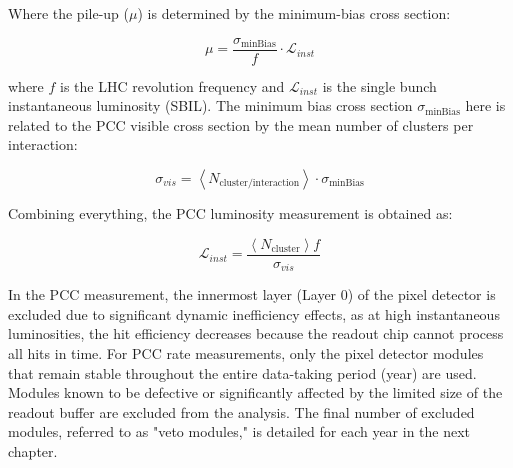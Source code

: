 Where the pile-up ($\mu$) is determined by the minimum-bias cross section: 

\begin{equation}
\mu = \frac{\sigma_{\text{minBias}}}{f} \cdot \mathcal{L}_{inst}
\end{equation}

where $f$ is the LHC revolution frequency and $\mathcal{L}_{inst}$ is the single bunch instantaneous luminosity (SBIL). The minimum bias cross section $\sigma_{\text{minBias}}$ here is related to the PCC visible cross section by the mean number of clusters per interaction:

\begin{equation}
\sigma_{vis}= \left < N_{\text{cluster}/\text{interaction}} \right >\cdot \sigma_{\text{minBias}}
\end{equation}

Combining everything, the PCC luminosity measurement is obtained as:

\begin{equation}
\mathcal{L}_{inst}=\frac{\left < N_{\text{cluster}} \right> f}{\sigma_{vis}}
\end{equation}

In the PCC measurement, the innermost layer (Layer 0) of the pixel detector is excluded due to significant dynamic inefficiency effects, as at high instantaneous luminosities, the hit efficiency decreases because the readout chip cannot process all hits in time. For PCC rate measurements, only the pixel detector modules that remain stable throughout the entire data-taking period (year) are used. Modules known to be defective or significantly affected by the limited size of the readout buffer are excluded from the analysis. The final number of excluded modules, referred to as "veto modules," is detailed for each year in the next chapter.



